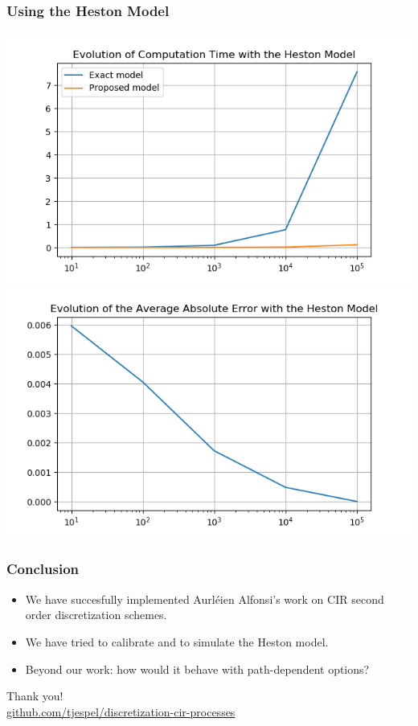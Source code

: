 \documentclass[12pt]{beamer}
\begin{document}
\begin{frame}
\frametitle{Using the Heston Model}
\includegraphics[width=.5\textwidth]{heston_time.png}
\includegraphics[width=.5\textwidth]{heston_error.png}
\end{frame}

\begin{frame}
\frametitle{Conclusion}
\begin{itemize}
  \item We have succesfully implemented Aurléien Alfonsi's work on CIR second order discretization schemes.
  \item We have tried to calibrate and to simulate the Heston model.
  \item Beyond our work: how would it behave with path-dependent options?
\end{itemize}
\end{frame}


\begin{frame}
\centering
{\Large Thank you!}
\\[1cm]
{\small\url{github.com/tjespel/discretization-cir-processes}}
\end{frame}
\end{document}
